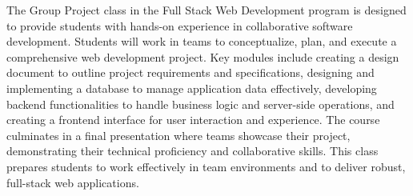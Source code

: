 The Group Project class in the Full Stack Web Development program is designed to provide students with hands-on experience in collaborative software development.
Students will work in teams to conceptualize, plan, and execute a comprehensive web development project. Key modules include creating a design document to outline project requirements and specifications, designing and implementing a database to manage application data effectively, developing backend functionalities to handle business logic and server-side operations, and creating a frontend interface for user interaction and experience.
The course culminates in a final presentation where teams showcase their project, demonstrating their technical proficiency and collaborative skills.
This class prepares students to work effectively in team environments and to deliver robust, full-stack web applications.
